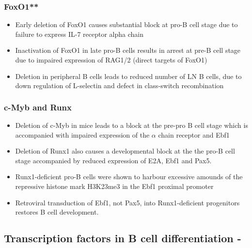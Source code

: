 \documentclass[12pt]{article}
\begin{document}
	\subsubsection{FoxO1**}
	
	\begin{itemize}
		\item Early deletion of FoxO1 causes substantial block at pro-B cell stage due to failure to express IL-7 receptor alpha chain 
		\item Inactivation of FoxO1 in late pro-B cells results in arrest at pre-B cell stage due to impaired expression of RAG1/2 (direct targets of FoxO1)
		\item Deletion in peripheral B cells leads to reduced number of LN B cells, due to down regulation of L-selectin and defect in class-switch recombination
	\end{itemize}
	
	\subsubsection{c-Myb and Runx}
	
	\begin{itemize}
		\item Deletion of c-Myb in mice leads to a block at the pre-pro B cell stage which is accompanied with impaired expression of the $\alpha$ chain receptor and Ebf1
		\item Deletion of Runx1 also causes a developmental block at the the pro-B cell stage accompanied by reduced expression of E2A, Ebf1 and Pax5. 
		\item Runx1-deficient pro-B cells were shown to harbour excessive amounds of the repressive histone mark H3K23me3 in the Ebf1 proximal promoter
		\item Retroviral transduction of Ebf1, not Pax5, into Runx1-deficient progenitors restores B cell development. 
	\end{itemize}
	
	\subsection{Transcription factors in B cell differentiation - \citeauthor{Li13} \citeyear{Li13}} 
	
\end{document}
